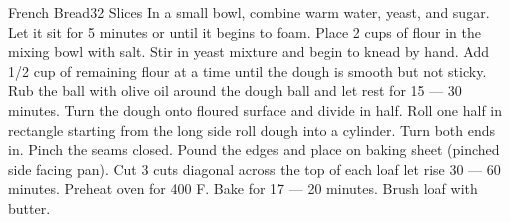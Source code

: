 \documentclass[../cookbook.tex]{subfiles}
\begin{document}
\begin{recipe}{French Bread}{32 Slices}{}
    In a small bowl, combine warm water, yeast,
    and sugar. Let it sit for 5 minutes or until
    it begins to foam.
    Place 2 cups of flour in the mixing bowl with salt.
    Stir in yeast mixture and begin to knead by hand.
    Add 1/2 cup of remaining flour at a time until the
    dough is smooth but not sticky.
    Rub the ball with olive oil around the dough ball
    and let rest for 15 --- 30 minutes. Turn the dough
    onto floured surface and divide in half. Roll one
    half in rectangle starting from the long side roll
    dough into a cylinder. Turn both ends in. Pinch the
    seams closed. Pound the edges and place on baking sheet
    (pinched side facing pan). Cut 3 cuts diagonal across
    the top of each loaf let rise 30 --- 60 minutes. Preheat
    oven for 400\degrees{} F. Bake for 17 --- 20 minutes.
    Brush loaf with butter.
\end{recipe}
\end{document}
